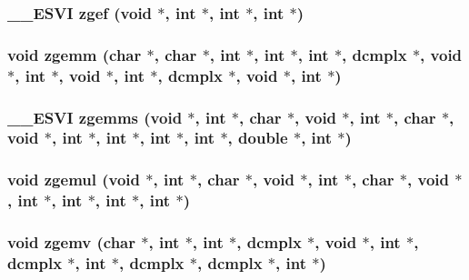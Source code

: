 \subsubsection{\setlength{\rightskip}{0pt plus 5cm}\_\-\_\-ESVI zgef (void $\ast$, int $\ast$, int $\ast$, int $\ast$)}\label{essl_8h_d7d9741ba022ac0fa67618e83e09ab75}


\subsubsection{\setlength{\rightskip}{0pt plus 5cm}void zgemm (char $\ast$, char $\ast$, int $\ast$, int $\ast$, int $\ast$, {\bf dcmplx} $\ast$, void $\ast$, int $\ast$, void $\ast$, int $\ast$, {\bf dcmplx} $\ast$, void $\ast$, int $\ast$)}\label{essl_8h_ad31c48f9d1e267c90657859a1d1c139}


\subsubsection{\setlength{\rightskip}{0pt plus 5cm}\_\-\_\-ESVI zgemms (void $\ast$, int $\ast$, char $\ast$, void $\ast$, int $\ast$, char $\ast$, void $\ast$, int $\ast$, int $\ast$, int $\ast$, int $\ast$, double $\ast$, int $\ast$)}\label{essl_8h_135d3a002bee96bafb3132d64e294049}


\subsubsection{\setlength{\rightskip}{0pt plus 5cm}void zgemul (void $\ast$, int $\ast$, char $\ast$, void $\ast$, int $\ast$, char $\ast$, void $\ast$, int $\ast$, int $\ast$, int $\ast$, int $\ast$)}\label{essl_8h_1ce6acc354ccb467e16819c606b5cedb}


\subsubsection{\setlength{\rightskip}{0pt plus 5cm}void zgemv (char $\ast$, int $\ast$, int $\ast$, {\bf dcmplx} $\ast$, void $\ast$, int $\ast$, {\bf dcmplx} $\ast$, int $\ast$, {\bf dcmplx} $\ast$, {\bf dcmplx} $\ast$, int $\ast$)}\label{essl_8h_081d06527226cfb42c26e94a938df77e}


